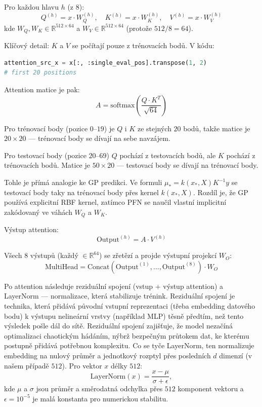 Pro každou hlavu $h$ (z $8$):
$$Q^{(h)} = x \cdot W_Q^{(h)}, \quad K^{(h)} = x \cdot W_K^{(h)}, \quad V^{(h)} = x \cdot W_V^{(h)}$$
kde $W_Q, W_K \in \mathbb{R}^{512 \times 64}$ a $W_V \in \mathbb{R}^{512 \times 64}$ (protože $512 / 8 = 64$).

Klíčový detail: $K$ a $V$ se počítají pouze z trénovacích bodů. V kódu:
\begin{lstlisting}[language=Python]
attention_src_x = x[:, :single_eval_pos].transpose(1, 2)  
# first 20 positions
\end{lstlisting}
Attention matice je pak:
$$A = \text{softmax}\left(\frac{Q \cdot K^T}{\sqrt{64}}\right)$$

Pro trénovací body (pozice $0$–$19$) je $Q$ i $K$ ze stejných $20$ bodů, takže matice je $20 \times 20$ — trénovací body se dívají na sebe navzájem.

Pro testovací body (pozice $20$–$69$) $Q$ pochází z testovacích bodů, ale $K$ pochází z trénovacích bodů. Matice je $50 \times 20$ — testovací body se dívají na trénovací body.

Tohle je přímá analogie ke GP predikci. Ve formuli $\mu_* = k(x_*, X) K^{-1} y$ se testovací body taky  na trénovací body přes kernel $k(x_*, X)$. Rozdíl je, že GP používá explicitní RBF kernel, zatímco PFN se naučil vlastní implicitní  zakódovaný ve váhách $W_Q$ a $W_K$.

Výstup attention:
$$\text{Output}^{(h)} = A \cdot V^{(h)}$$

Všech $8$ výstupů (každý $\in \mathbb{R}^{64}$) se zřetězí a projde výstupní projekcí $W_O$:
$$\text{MultiHead} = \text{Concat}(\text{Output}^{(1)}, \dots, \text{Output}^{(8)}) \cdot W_O$$

Po attention následuje reziduální spojení (vstup $+$ výstup attention) a LayerNorm — normalizace, která stabilizuje trénink.
Reziduální spojení je technika, která přidává původní vstupní reprezentaci (třeba embedding datového bodu) k výstupu nelineární vrstvy (například MLP) těsně předtím, než tento výsledek pošle dál do sítě.
Reziduální spojení zajišťuje, že model nezačíná optimalizaci chaotickým hádáním, nýbrž bezpečným průtokem dat, ke kterému postupně přidává potřebnou komplexitu.
Co se tyče LayerNorm, ten normalizuje embedding na nulový průměr a jednotkový rozptyl přes posledních $d$ dimenzí (v našem případě $512$). 
Pro vektor $x$ délky $512$:
$$\text{LayerNorm}(x) = \frac{x - \mu}{\sigma + \epsilon},$$
kde $\mu$ a $\sigma$ jsou průměr a směrodatná odchylka přes $512$ komponent vektoru a $\epsilon = 10^{-5}$ je malá konstanta pro numerickou stabilitu.

